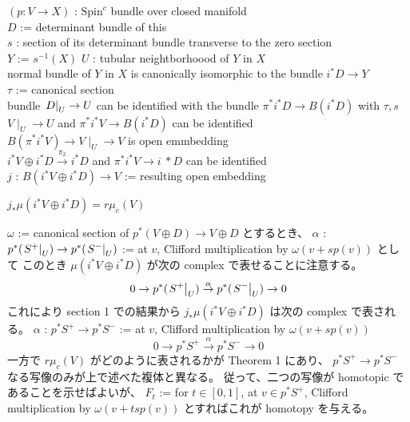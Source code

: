 \begin{Definition}
\itemwhen
  \For \((p : V \to X)\) : \(\text{Spin}^c\) bundle over closed manifold \\
  \Let \(D\) := determinant bundle of this \\
  \For \(s\) : section of its determinant bundle transverse to the zero section \\
  \Let \(Y\) := \(s^{-1}(X)\)
  \For \(U\) : tubular neightborhoood of \(Y\) in \(X\) \\
\itemprop
  \Then normal bundle of \(Y\) in \(X\) is canonically isomorphic to the bundle \(i^*D \to Y\) \\
\itemprop
  \Define \(\tau\) := canonical section \\
  \Then bundle \(\left. {D} \right| _{U} \to U\) can be identified with the bundle \(\pi^*{i^* D} \to B(i^*D)\) with \(\tau , s\)
\itemprop
  \Then \(V \mid_U \to U\) and \(\pi^* {i^* V} \to B(i^*D)\) can be identified \\
  \Then \(B(\pi^*{i^* V}) \to V \mid_U \to V\) is open emmbedding \\
  \Then \(i^*V \oplus i^* D \overset{\pi_2}{\to} i^* D\) and \(\pi^*{i^*V} \to i~* D\) can be identified \\
\itemdefi
  \Define \(j\) : \(B(i^*V \oplus i^* D) \to V\) := resulting open embedding
\end{Definition}

\begin{Theorem}
\itemprop
  \Then \(j_* \mu(i^* V \oplus i^* D) = r \mu_c(V)\)
\end{Theorem}

\begin{Proof}
\itemprof
  \(\omega\) := canonical section of \(p^*(V \oplus D) \to V \oplus D\) とするとき、
  \(\alpha\) : \(p^*(\left. {S^{+}} \right| _{U}) \to p^*(\left. {S^{-}} \right| _{U})\) := at \(v\), Clifford multiplication by \(\omega (v + s p(v))\) として
  このとき \(\mu({i^*} V \oplus {i^*} D)\) が次の complex で表せることに注意する。
  \[
    0 \to {p^*} (\left. {S^{+}} \right| _{U}) \overset{\alpha}{\to} {p^*} (\left. {S^{-}} \right| _{U}) \to 0
  \]
  これにより section 1 での結果から \({j_*} \mu({i^*} V \oplus {i^*} D)\) は次の complex で表される。
  \(\alpha\) : \({p^*} S^{+} \to {p^*} S^{-}\) := at \(v\), Clifford multiplication by \(\omega (v + s p (v))\) 
  \[
    0 \to {p^*} S^{+} \overset{\alpha}{\to} {p^*} S^{-} \to 0
  \]
  一方で \(r \mu_c (V)\) がどのように表されるかが Theorem 1 にあり、 \({p^*} S^{+} \to {p^*} S^{-}\) なる写像のみが上で述べた複体と異なる。
  従って、二つの写像が homotopic であることを示せばよいが、
  \(F_t\) := for \(t \in [0,1]\), at \(v \in {p^*} S^{+}\), Clifford multiplication by \(\omega (v + t s p(v))\) とすればこれが homotopy を与える。
\end{Proof}